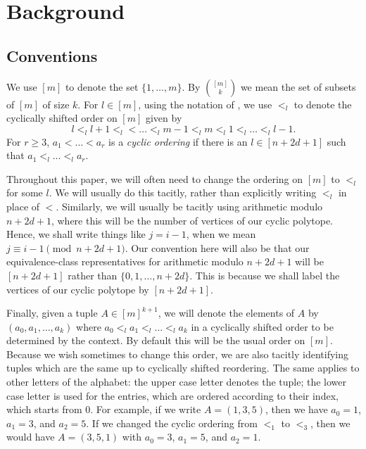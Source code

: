 \documentclass[ALCO,Unicode,published]{cedram}
\begin{document}
\section{Background}\label{sect:back}

\subsection{Conventions}

We use $[m]$ to denote the set $\{1, \dots, m\}$. By $\binom{[m]}{k}$ we mean the set of subsets of $[m]$ of size $k$. For $l \in [m]$, using the notation of \cite{ops}, we use $<_{l}$ to denote the cyclically shifted order on $[m]$ given by \[l <_{l} l+1 <_{l} < \dots <_{l} m-1 <_{l} m <_{l} 1 <_{l} \dots <_{l} l-1 .\] For $r \geqslant 3$, $a_{1} < \dots < a_{r}$ is a \emph{cyclic ordering} if there is an $l \in [n + 2d + 1]$ such that $a_{1} <_{l} \dots <_{l} a_{r}$.

Throughout this paper, we will often need to change the ordering on $[m]$ to $<_{l}$ for some $l$. We will usually do this tacitly, rather than explicitly writing $<_{l}$ in place of $<$. Similarly, we will usually be tacitly using arithmetic modulo $n + 2d + 1$, where this will be the number of vertices of our cyclic polytope. Hence, we shall write things like $j = i - 1$, when we mean $j \equiv i - 1 \pmod{n + 2d + 1}$. Our convention here will also be that our equivalence-class representatives for arithmetic modulo $n + 2d + 1$ will be $[n + 2d + 1]$ rather than $\{0, 1, \dots, n + 2d\}$. This is because we shall label the vertices of our cyclic polytope by $[n + 2d + 1]$.

Finally, given a tuple $A \in [m]^{k + 1}$, we will denote the elements of $A$ by $(a_{0}, a_{1}, \dots, a_{k})$ where $a_{0} <_{l} a_{1} <_{l} \dots <_{l} a_{k}$ in a cyclically shifted order to be determined by the context. By default this will be the usual order on $[m]$. Because we wish sometimes to change this order, we are also tacitly identifying tuples which are the same up to cyclically shifted reordering. The same applies to other letters of the alphabet: the upper case letter denotes the tuple; the lower case letter is used for the entries, which are ordered according to their index, which starts from 0. For example, if we write $A = (1, 3, 5)$, then we have $a_{0} = 1$, $a_{1} = 3$, and $a_{2} = 5$. If we changed the cyclic ordering from $<_{1}$ to $<_{3}$, then we would have $A = (3, 5, 1)$ with $a_{0} = 3$, $a_{1} = 5$, and $a_{2} = 1$.
\end{document}
